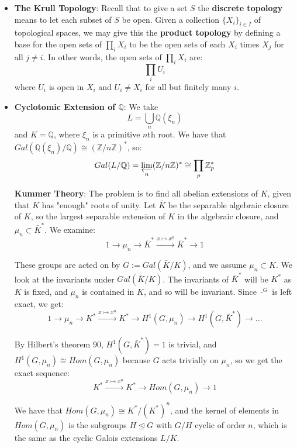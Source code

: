 \documentclass[11pt, oneside]{amsart}   	%
\theoremstyle{definition}
\begin{document}
\begin{itemize}
	\item \textbf{The Krull Topology}: Recall that to give a set $S$ the \textbf{discrete topology} means to let each subset of $S$ be open. Given a 
	collection $\{X_i\}_{i\in I}$ of topological spaces, we may give this the \textbf{product topology} by defining a base for the open sets of $\prod_iX_i$ 
	to be the open sets of each $X_i$ times $X_j$ for all $j\neq i$. In other words, the open sets of $\prod_i X_i$ are:
	$$
		\prod_iU_i
	$$
	where $U_i$ is open in $X_i$ and $U_i\neq X_i$ for all but finitely many $i$. 
	
	\item \textbf{Cyclotomic Extension of $\mathbb Q$}: We take 
	$$
		L = \bigcup_n\mathbb Q(\xi_n)
	$$
	and $K = \mathbb Q$, where $\xi_n$ is a primitive $n$th root. We have that $Gal(\mathbb Q(\xi_n) / \mathbb Q)\cong (\mathbb Z / n\mathbb Z)^*$, so:
	$$
		Gal(L / \mathbb Q) = \varprojlim_n (\mathbb Z / n\mathbb Z)^*\cong \prod_p\mathbb Z_p^*
	$$
	
	\textbf{Kummer Theory}: The problem is to find all abelian extensions of $K$, given that $K$ has "enough" roots of unity. Let $\bar K$ be the 
	separable algebraic closure of $K$, so the largest separable extension of $K$ in the algebraic closure, and $\mu_n\subset \bar K^*$. We examine:
	$$
		1\rightarrow\mu_n\rightarrow\bar K^*\xrightarrow{x\mapsto x^n}\bar K^*\rightarrow 1
	$$
	
	These groups are acted on by $G := Gal(\bar K / K)$, and we assume $\mu_n\subset K$. We look at the invariants under $Gal(\bar K / K)$. The 
	invariants of $\bar K^*$ will be $K^*$ as $K$ is fixed, and $\mu_n$ is contained in $K$, and so will be invariant. Since $\cdot^G$ is left exact, we get:
	$$
		1\rightarrow\mu_n\rightarrow K^*\xrightarrow{x\mapsto x^n} K^*\rightarrow H^1(G, \mu_n)\rightarrow H^1(G, \bar K^*)\rightarrow ...
	$$
	
	By Hilbert's theorem 90, $H^1(G, \bar K^*) = 1$ is trivial, and $H^1(G, \mu_n)\cong Hom(G, \mu_n)$ because $G$ acts trivially on $\mu_n$, so we get 
	the exact sequence:
	$$
		K^*\xrightarrow{x\mapsto x^n} K^*\rightarrow Hom(G, \mu_n)\rightarrow 1
	$$
	
	We have that $Hom(G, \mu_n)\cong K^* / (K^*)^n$, and the kernel of elements in $Hom(G, \mu_n)$ is the subgroups $H\trianglelefteq G$ with 
	$G / H$ cyclic of order $n$, which is the same as the cyclic Galois extensions $L / K$. 

\end{itemize}
\end{document}
